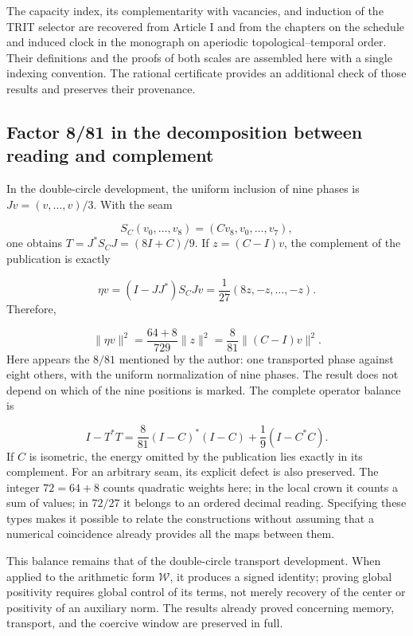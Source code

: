 The capacity index, its complementarity with vacancies, and induction of the TRIT selector are recovered from Article I and from the chapters on the schedule and induced clock in the monograph on aperiodic topological--temporal order. Their definitions and the proofs of both scales are assembled here with a single indexing convention. The rational certificate provides an additional check of those results and preserves their provenance.



\subsection{Factor 8/81 in the decomposition between reading and complement}
In the double-circle development, the uniform inclusion of nine phases is \(Jv=(v,\ldots,v)/3\). With the seam

\[
S_C(v_0,\ldots,v_8)=(Cv_8,v_0,\ldots,v_7),
\]
one obtains \(T=J^*S_CJ=(8I+C)/9\). If \(z=(C-I)v\), the complement of the publication is exactly

\[
\eta v=(I-JJ^*)S_CJv=\frac1{27}(8z,-z,\ldots,-z).
\]
Therefore,

\[
\|\eta v\|^2=\frac{64+8}{729}\|z\|^2
=\frac8{81}\|(C-I)v\|^2.
\]
Here appears the \(8/81\) mentioned by the author: one transported phase against eight others, with the uniform normalization of nine phases. The result does not depend on which of the nine positions is marked. The complete operator balance is

\[
I-T^*T=\frac8{81}(I-C)^*(I-C)+\frac19(I-C^*C).
\]
If \(C\) is isometric, the energy omitted by the publication lies exactly in its complement. For an arbitrary seam, its explicit defect is also preserved. The integer \(72=64+8\) counts quadratic weights here; in the local crown it counts a sum of values; in \(72/27\) it belongs to an ordered decimal reading. Specifying these types makes it possible to relate the constructions without assuming that a numerical coincidence already provides all the maps between them.

This balance remains that of the double-circle transport development. When applied to the arithmetic form \(\mathscr W\), it produces a signed identity; proving global positivity requires global control of its terms, not merely recovery of the center or positivity of an auxiliary norm. The results already proved concerning memory, transport, and the coercive window are preserved in full.

